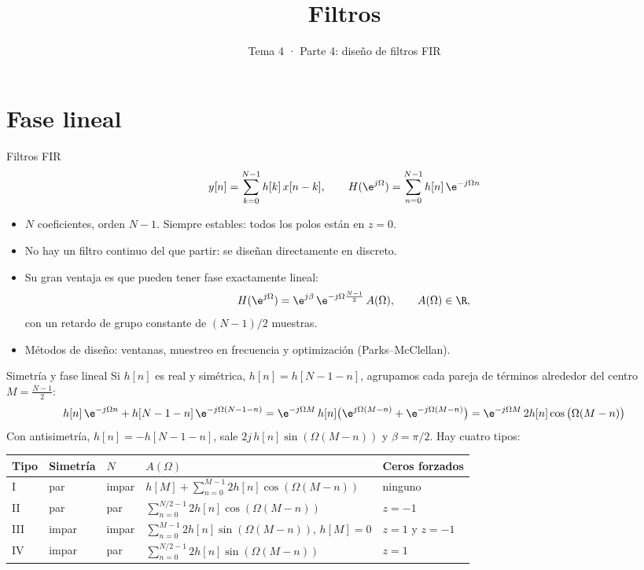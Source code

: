 \documentclass[aspectratio=169,11pt]{beamer}
\title[T4 · Filtros FIR]{Filtros}
\subtitle{Tema 4 · Parte 4: diseño de filtros FIR}
\begin{document}
\portada

\section{Fase lineal}

\begin{frame}{Filtros FIR}
  \[
    y[n]=\sum_{k=0}^{N-1}h[k]\,x[n-k],\qquad H(\e^{j\Omega})=\sum_{n=0}^{N-1}h[n]\,\e^{-j\Omega n}
  \]
  \begin{itemize}
    \item $N$ coeficientes, orden $N-1$. Siempre estables: todos los polos están en $z=0$.
    \item No hay un filtro continuo del que partir: se diseñan directamente en discreto.
    \item Su gran ventaja es que pueden tener \alert{fase exactamente lineal}:
    \[
      H(\e^{j\Omega})=\e^{j\beta}\,\e^{-j\Omega\frac{N-1}{2}}\,A(\Omega),\qquad A(\Omega)\in\R,
    \]
    con un retardo de grupo constante de $(N-1)/2$ muestras.
    \item Métodos de diseño: \alert{ventanas}, \alert{muestreo en frecuencia} y \alert{optimización} (Parks–McClellan).
  \end{itemize}
\end{frame}

\begin{frame}{Simetría y fase lineal}
  \small
  Si $h[n]$ es real y \alert{simétrica}, $h[n]=h[N-1-n]$, agrupamos cada pareja de términos alrededor del centro $M=\frac{N-1}2$:
  \[
    h[n]\,\e^{-j\Omega n}+h[N-1-n]\,\e^{-j\Omega(N-1-n)}=\e^{-j\Omega M}\,h[n]\big(\e^{j\Omega(M-n)}+\e^{-j\Omega(M-n)}\big)=\e^{-j\Omega M}\,2h[n]\cos\big(\Omega(M-n)\big)
  \]
  Con \alert{antisimetría}, $h[n]=-h[N-1-n]$, sale $2j\,h[n]\sin(\Omega(M-n))$ y $\beta=\pi/2$. Hay cuatro tipos:
  \footnotesize
  \renewcommand{\arraystretch}{1.5}
  \begin{center}
    \begin{tabular}{@{}lllll@{}}
      \toprule
      Tipo & Simetría & $N$ & $A(\Omega)$ & Ceros forzados\\\midrule
      I & par & impar & $h[M]+\sum_{n=0}^{M-1}2h[n]\cos(\Omega(M-n))$ & ninguno\\
      II & par & par & $\sum_{n=0}^{N/2-1}2h[n]\cos(\Omega(M-n))$ & $z=-1$\\
      III & impar & impar & $\sum_{n=0}^{M-1}2h[n]\sin(\Omega(M-n))$, $h[M]=0$ & $z=1$ y $z=-1$\\
      IV & impar & par & $\sum_{n=0}^{N/2-1}2h[n]\sin(\Omega(M-n))$ & $z=1$\\\bottomrule
    \end{tabular}
  \end{center}
\end{frame}
\end{document}
